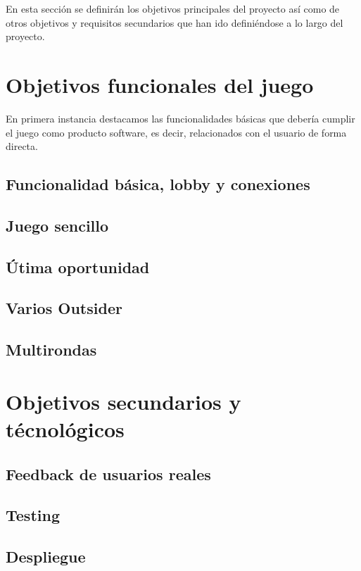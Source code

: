 En esta sección se definirán los objetivos principales del proyecto así como de otros objetivos y
requisitos secundarios que han ido definiéndose a lo largo del proyecto.

\section{Objetivos funcionales del juego}

En primera instancia destacamos las funcionalidades básicas que debería cumplir el juego como
producto software, es decir, relacionados con el usuario de forma directa.

\subsection{Funcionalidad básica, lobby y conexiones}



\subsection{Juego sencillo}

\subsection{Útima oportunidad}

\subsection{Varios Outsider}

\subsection{Multirondas}

\section{Objetivos secundarios y técnológicos}

\subsection{Feedback de usuarios reales}

\subsection{Testing}

\subsection{Despliegue}

